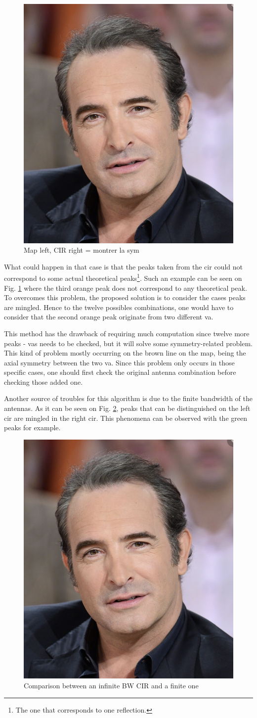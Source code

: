 \begin{figure}[H]
\centering
\includegraphics[width=.2\linewidth]{Images/Temporary_pic.png}
\caption{Map left, CIR right = montrer la sym \label{fig:va_sym}}
\end{figure}

What could happen in that case is that the peaks taken from the \gls{cir} could not correspond to some actual theoretical peaks\footnote{The one that corresponds to one reflection. }. Such an example can be seen on Fig. \ref{fig:va_sym} where the third orange peak does not correspond to any theoretical peak. To overcomes this problem, the proposed solution is to consider the cases peaks are mingled. Hence to the twelve possibles combinations, one would have to consider that the second orange peak originate from two different \gls{va}.
\vspace{2mm}

This method has the drawback of requiring much computation since twelve more peaks - \glspl{va} needs to be checked, but it will solve some symmetry-related problem. This kind of problem mostly occurring on the brown line on the map, being the axial symmetry between the two \gls{va}. Since this problem only occurs in those specific cases, one should first check the original antenna combination before checking those added one.
\vspace{2mm}

Another source of troubles for this algorithm is due to the finite bandwidth of the antennas. As it can be seen on Fig. \ref{fig:inftofin}, peaks that can be distinguished on the left \gls{cir} are mingled in the right \gls{cir}. This phenomena can be observed with the green peaks for example.

\begin{figure}[H]
\centering
\includegraphics[width=.2\linewidth]{Images/Temporary_pic.png}
\caption{Comparison between an infinite BW CIR and a finite one \label{fig:inftofin}}
\end{figure}

